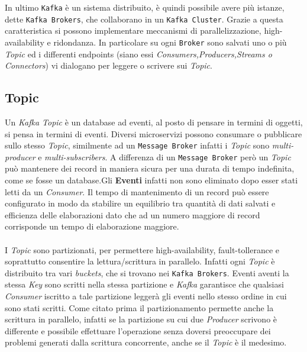 In ultimo \texttt{Kafka} è un sistema distribuito, è quindi possibile avere più istanze, dette \texttt{Kafka Brokers}, che collaborano in un \texttt{Kafka Cluster}. Grazie a questa caratteristica si possono implementare meccanismi di parallelizzazione, high-availability e ridondanza.
In particolare su ogni \texttt{Broker} sono salvati uno o più \textit{Topic} ed i differenti endpoints (siano essi \textit{Consumers,Producers,Streams o Connectors}) vi dialogano per leggere o scrivere sui \textit{Topic}.

\subsection{Topic}
\label{subsec:kafka_topics}

Un \textit{Kafka Topic} è un database ad eventi, al posto di pensare in termini di oggetti, si pensa in termini di eventi.
Diversi microservizi possono consumare o pubblicare sullo stesso \textit{Topic}, similmente ad un \texttt{Message Broker} infatti i \textit{Topic} sono \textit{multi-producer} e \textit{multi-subscribers}.
A differenza di un \texttt{Message Broker} però un \textit{Topic} può mantenere dei record in maniera sicura per una durata di tempo indefinita, come se fosse un database.Gli \textbf{Eventi} infatti non sono eliminato dopo esser stati letti da un \textit{Consumer}. Il tempo di mantenimento di un record può essere configurato in modo da stabilire un equilibrio tra quantità di dati salvati e efficienza delle elaborazioni dato che ad un numero maggiore di record corrisponde un tempo di elaborazione maggiore.\\\\
I \textit{Topic} sono partizionati, per permettere high-availability, fault-tollerance e soprattutto consentire la lettura/scrittura in parallelo.
Infatti ogni \textit{Topic} è distribuito tra vari \textit{buckets}, che si trovano nei \texttt{Kafka Brokers}.
Eventi aventi la stessa \textit{Key} sono scritti nella stessa partizione e \textit{Kafka} garantisce che qualsiasi \textit{Consumer} iscritto a tale partizione leggerà gli eventi nello stesso ordine in cui sono stati scritti.
Come citato prima il partizionamento permette anche la scrittura in parallelo, infatti se la partizione su cui due \textit{Producer} scrivono è differente e possibile effettuare l'operazione senza doversi preoccupare dei problemi generati dalla scrittura concorrente, anche se il \textit{Topic} è il medesimo.



